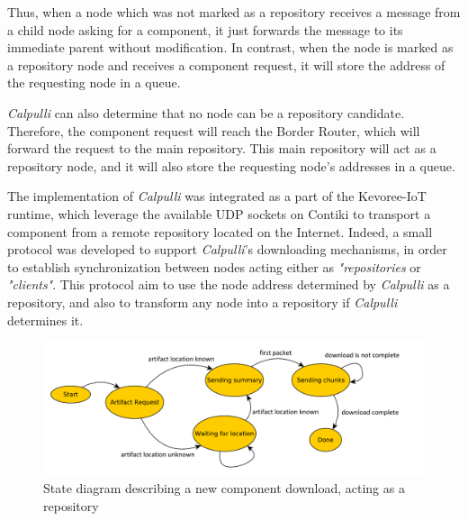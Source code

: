 Thus, when a node which was not marked as a repository receives a message from a child node asking for a component, it just forwards the message to its immediate parent without modification.
In contrast, when the node is marked as a repository node and receives a component request, it will store the address of the requesting node in a queue.

\textit{Calpulli} can also determine that no node can be a repository candidate.
Therefore, the component request will reach the Border Router, which will forward the request to the main repository.
This main repository will act as a repository node, and it will also store the requesting node's addresses in a queue.

The implementation of \textit{Calpulli} was integrated as a part of the Kevoree-IoT runtime, which leverage the available UDP sockets on Contiki to transport a component from a remote repository located on the Internet.
Indeed, a small protocol was developed to support \textit{Calpulli}'s downloading mechanisms, in order to establish synchronization between nodes acting either as \textit{"repositories} or \textit{"clients"}.
This protocol aim to use the node address determined by \textit{Calpulli} as a repository, and also to transform any node into a repository if \textit{Calpulli} determines it.

\begin{figure}[]
	\centering
	\includegraphics[width=0.98\columnwidth]{chapters/inter-node.images/calpulliProtocol.pdf}
	\caption{State diagram describing a new component download, acting as a repository} \label{fig:calpulliProtocol}
\end{figure}


